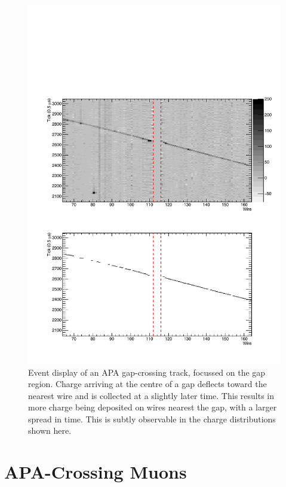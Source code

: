 \begin{figure}
  \centering
  \includegraphics[width=12cm]{evd_gap.pdf}
  \caption[Event display of an APA gap-crossing track, focussed on the gap region.]{Event display of an APA gap-crossing track, focussed on the gap region.  Charge arriving at the centre of a gap deflects toward the nearest wire and is collected at a slightly later time.  This results in more charge being deposited on wires nearest the gap, with a larger spread in time.  This is subtly observable in the charge distributions shown here.}
  \label{fig:evd_gap}
\end{figure}

\section{APA-Crossing Muons}\label{sec:APACrossing}

